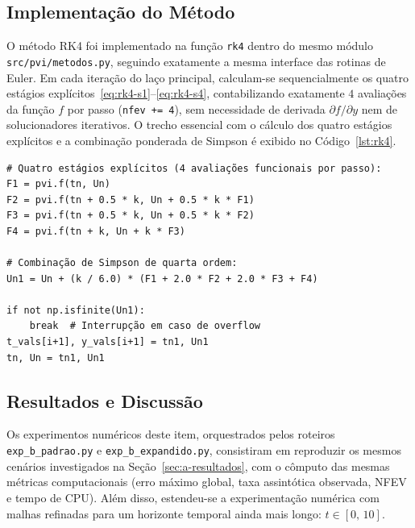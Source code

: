 \documentclass[12pt, a4paper]{article}
\begin{document}
\subsection{Implementação do Método}
\label{sec:b-implementacao}

O método RK4 foi implementado na função \texttt{rk4} dentro do mesmo módulo \texttt{src/pvi/metodos.py}, seguindo
exatamente a mesma interface das rotinas de Euler. Em cada iteração do laço principal, calculam-se sequencialmente os
quatro estágios explícitos~\eqref{eq:rk4-s1}--\eqref{eq:rk4-s4}, contabilizando exatamente $4$ avaliações da função $f$
por passo (\texttt{nfev += 4}), sem necessidade de derivada $\partial f/\partial y$ nem de solucionadores iterativos. O trecho essencial com o cálculo dos quatro estágios explícitos e a combinação ponderada de Simpson é exibido no Código~\ref{lst:rk4}.

\begin{listing}[H]
\caption{Quatro estágios explícitos e avanço temporal do método RK4.}\label{lst:rk4}
\begin{verbatim}
# Quatro estágios explícitos (4 avaliações funcionais por passo):
F1 = pvi.f(tn, Un)
F2 = pvi.f(tn + 0.5 * k, Un + 0.5 * k * F1)
F3 = pvi.f(tn + 0.5 * k, Un + 0.5 * k * F2)
F4 = pvi.f(tn + k, Un + k * F3)

# Combinação de Simpson de quarta ordem:
Un1 = Un + (k / 6.0) * (F1 + 2.0 * F2 + 2.0 * F3 + F4)

if not np.isfinite(Un1):
    break  # Interrupção em caso de overflow
t_vals[i+1], y_vals[i+1] = tn1, Un1
tn, Un = tn1, Un1
\end{verbatim}
\end{listing}


\subsection{Resultados e Discussão}
\label{sec:b-resultados}
Os experimentos numéricos deste item, orquestrados pelos roteiros \texttt{exp\_b\_padrao.py} e \texttt{exp\_b\_expandido.py}, consistiram em reproduzir os mesmos cenários investigados na Seção~\ref{sec:a-resultados}, com o cômputo das mesmas métricas computacionais (erro máximo global, taxa assintótica observada, NFEV e tempo de CPU). 
Além disso, estendeu-se a experimentação numérica com malhas refinadas para um horizonte temporal ainda mais longo: $t \in [0,\, 10]$.
\end{document}
